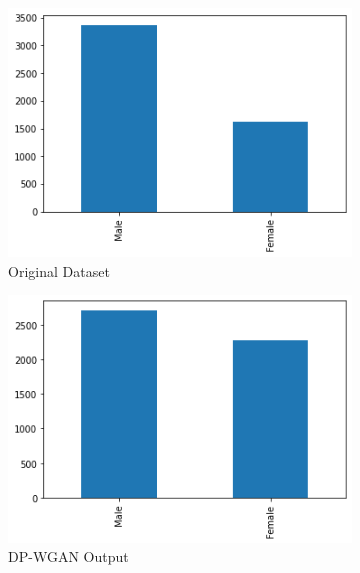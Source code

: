 \documentclass{article}
\begin{document}
\begin{figure}
     \centering
     \begin{subfigure}[b]{0.24\textwidth}
         \centering
         \includegraphics[width=\textwidth]{images/original_hist_sex.png}
         \caption{Original Dataset}
         \label{fig:histogram_original}
     \end{subfigure}
     \hfill
     \begin{subfigure}[b]{0.24\textwidth}
         \centering
         \includegraphics[width=\textwidth]{images/dpgan_hist_sex.png}
         \caption{DP-WGAN Output}
         \label{fig:histogram_dpgan}
     \end{subfigure}
     \hfill
     \begin{subfigure}[b]{0.24\textwidth}
        \centering

\end{subfigure}
\end{figure}
\end{document}
